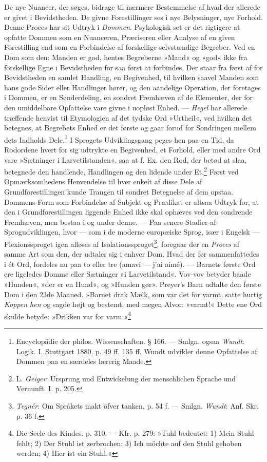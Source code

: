 \documentclass[12pt,a4paper,openany]{book}
\newcommand{\opage}[1]{\marginnote{\footnotesize\textit{[#1]}}}
\begin{document}
De nye Nuancer, der søges, bidrage til nærmere Bestemmelse af hvad der
allerede er givet i Bevidstheden. De givne Forestillinger ses i nye
Belysninger, nye Forhold. Denne Proces har sit Udtryk i \emph{Dommen}.
Psykologisk set er det rigtigere at opfatte Dommen som en Nuanceren,
Præciseren eller Analyse af en given Forestilling end som en Forbindelse
af forskellige selvstændige Begreber. Ved en Dom som den: Manden er god,
hentes Begreberne »Mand« og »god« ikke fra forskellige
\opage{219}Egne i Bevidstheden for saa først at forbindes. Der staar fra
først af for Bevidstheden en samlet Handling, en Begivenhed, til hvilken
saavel Manden som hans gode Sider eller Handlinger hører, og den
aandelige Operation, der foretages i Dommen, er en Sønderdeling, en
sondret Fremhæven af de Elementer, der for den umiddelbare Opfattelse
vare givne i uopløst Enhed. --- \emph{Hegel} har allerede træffende
henvist til Etymologien af det tydske Ord »Urtheil«, ved hvilken det
betegnes, at Begrebets Enhed er det første og gaar forud for Sondringen
mellem dets Indholds Dele.\footnote[1]{Encyclopädie der philos.
Wissenschaften. § 166. --- Smlgn. ogsaa \emph{Wundt}: Logik. I.
Stuttgart 1880. p. 49 ff, 135 ff. Wundt udvikler denne Opfattelse af
Dommen paa en særdeles lærerig Maade.} I Sprogets Udviklingsgang peges
hen paa en Tid, da Rodordene hvert for sig udtrykte en Begivenhed, et
Forhold, eller med andre Ord vare »Sætninger i Larvetilstanden«, saa at
f. Ex. den Rod, der betød at slaa, betegnede den handlende, Handlingen
og den lidende under Et.\footnote[2]{L. \emph{Geiger}: Ursprung und
Entwickelung der menschlichen Sprache und Vernunft. I. p. 205.} Først
ved Opmærksomhedens Henvendelse til hver enkelt af disse Dele af
Grundforestillingen kunde Trangen til sondret Betegnelse af dem opstaa.
Dommens Form som Forbindelse af Subjekt og Prædikat er altsaa Udtryk
for, at den i Grundforestillingen liggende Enhed ikke skal ophæves ved
den sondrende Fremhæven, men bestaa i og under denne. --- Paa senere
Stadier af Sprogudviklingen, hvor --- som i de moderne europæiske Sprog,
især i Engelsk --- Flexionssproget igen afløses af
Isolationssproget\footnote[3]{\emph{Tegnér}: Om Språkets makt öfver
tanken, p. 54 f. --- Smlgn. \emph{Wundt}: Anf. Skr. p. 36 f.}, foregaar
der en \emph{Proces} af samme Art som den, der udtaler sig i enhver Dom.
Hvad der før sammenfattedes i ét Ord, fordeles nu paa to eller tre
(amavi --- j’ai aimé). --- Barnets første Ord ere ligeledes Domme eller
Sætninger »i Larvetilstand«. Vov-vov betyder baade »Hunden«, »der er en
Hund«, og »Hunden gør». Preyer’s Barn udtalte den første Dom i den 23de
Maaned. »Barnet drak Mælk, som var det for varmt, satte hurtig
\emph{Koppen hen}
\opage{220}og sagde højt og bestemt, med megen Alvor: »varmt!« Dette ene
Ord skulde betyde: »Drikken var for varm.«\footnote[1]{Die Seele des
Kindes. p. 310. --- Kfr. p. 279: »Tuhl bedeutet: 1) Mein Stuhl fehlt; 2)
Der Stuhl ist zerbrochen; 3) Ich möchte auf den Stuhl gehoben werden; 4)
Hier ist ein Stuhl.«}
\end{document}
